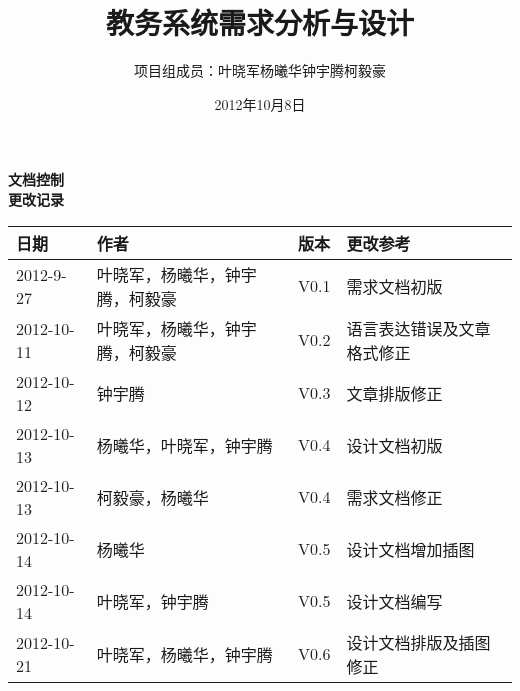 \documentclass[a4paper,11pt]{article}
\begin{document}
\begin{CJK*}{UTF8}{stzhongsong}

\title{教务系统需求分析与设计}
\author{项目组成员：叶晓军\quad 杨曦华\quad 钟宇腾\quad 柯毅豪}
\date{2012年10月8日}



\noindent \textbf{\LARGE 文档控制}\\

\noindent \textbf{\large 更改记录}\\

\begin{tabularx}{\textwidth}{|l|l|l|X|}
  \hline
  \textbf{日期} & \textbf{作者} & \textbf{版本} & \textbf{更改参考}\\
  \hline
  2012-9-27&叶晓军，杨曦华，钟宇腾，柯毅豪&V0.1&需求文档初版\\
  \hline
  2012-10-11&叶晓军，杨曦华，钟宇腾，柯毅豪&V0.2&语言表达错误及文章格式修正\\
  \hline
  2012-10-12&钟宇腾&V0.3&文章排版修正\\
  \hline
  2012-10-13&杨曦华，叶晓军，钟宇腾&V0.4&设计文档初版\\
  \hline
  2012-10-13&柯毅豪，杨曦华&V0.4&需求文档修正\\
  \hline
  2012-10-14&杨曦华&V0.5&设计文档增加插图\\
  \hline
  2012-10-14&叶晓军，钟宇腾&V0.5&设计文档编写\\
  \hline
  2012-10-21&叶晓军，杨曦华，钟宇腾&V0.6&设计文档排版及插图修正\\
  \hline
\end{tabularx}
\newpage

\tableofcontents
\newpage

\pagestyle{fancy}







\newpage
\end{CJK*}
\end{document}
